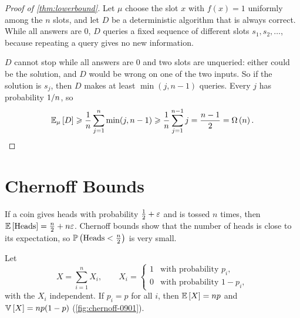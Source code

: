 \begin{proof}[Proof of \cref{thm:lowerbound}]
    Let $\mu$ choose the slot $x$ with $f(x) = 1$ uniformly among the $n$ slots, and let $D$ be a
    deterministic algorithm that is always correct. While all answers are $0$, $D$ queries a fixed
    sequence of different slots $s_1, s_2, \dots$, because repeating a query gives no new
    information.

    $D$ cannot stop while all answers are $0$ and two slots are unqueried: either could be the
    solution, and $D$ would be wrong on one of the two inputs. So if the solution is $s_j$, then
    $D$ makes at least $\min(j, n-1)$ queries. Every $j$ has probability $1/n$, so
    \[\operatorname{\mathbb{E}}_{\mu}\left[D\right] \geqslant \frac{1}{n} \sum_{j=1}^{n} \min(j, n-1)
        \geqslant \frac{1}{n} \sum_{j=1}^{n-1} j = \frac{n-1}{2} = \Omega\left(n\right). \qedhere\]
\end{proof}

\section{Chernoff Bounds}

If a coin gives heads with probability $\frac{1}{2} + \varepsilon$ and is tossed $n$ times, then
$\expectation{\text{Heads}} = \frac{n}{2} + n\eps$. Chernoff bounds show that the number of heads is
close to its expectation, so $\prob{\text{Heads} < \frac{n}{2}}$ is very small.

Let
\[X = \sum_{i=1}^{n} X_i,
    \qquad
    X_i = \begin{cases}
        1 & \text{with probability } p_i,     \\
        0 & \text{with probability } 1 - p_i,
    \end{cases}\]
with the $X_i$ independent. If $p_i = p$ for all $i$, then $\expectation{X} = np$ and
$\operatorname{\mathbb{V}}\left[X\right] = np(1-p)$ (\cref{fig:chernoff-0901}).

